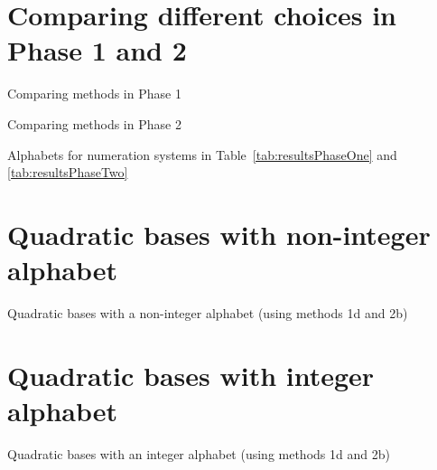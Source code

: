 

\section{Comparing different choices in Phase 1 and 2}
\label{sec:compareMethods}

\begin{landscape}
	\begin{table}[h]
		\begin{center}
		
		\end{center}
	\caption{Comparing methods in Phase 1}
	\label{tab:resultsPhaseOne}
	\end{table}
\end{landscape}

\begin{landscape}
	\begin{table}[h]
		\begin{center}
		
		\end{center}
	\caption{Comparing methods in Phase 2}
	\label{tab:resultsPhaseTwo}
	\end{table}
\end{landscape}

\begin{table}[h]
	\begin{center}
	
	\end{center}
\caption{Alphabets for numeration systems in Table~\ref{tab:resultsPhaseOne} and \ref{tab:resultsPhaseTwo}}
\label{tab:alphabets}
\end{table}

\section{Quadratic bases with non-integer alphabet}
\begin{table}[h]
	\begin{center}
	
	\end{center}
\caption{Quadratic bases with a non-integer alphabet (using methods 1d and 2b)}
\label{tab:resultsQuadrNonint}
\end{table}

 
\section{Quadratic bases with integer alphabet}
\begin{table}[h]
	\begin{center}
	
	\end{center}
\caption{Quadratic bases with an integer alphabet (using methods 1d and 2b)}
\label{tab:resultsQuadrInt}
\end{table}


